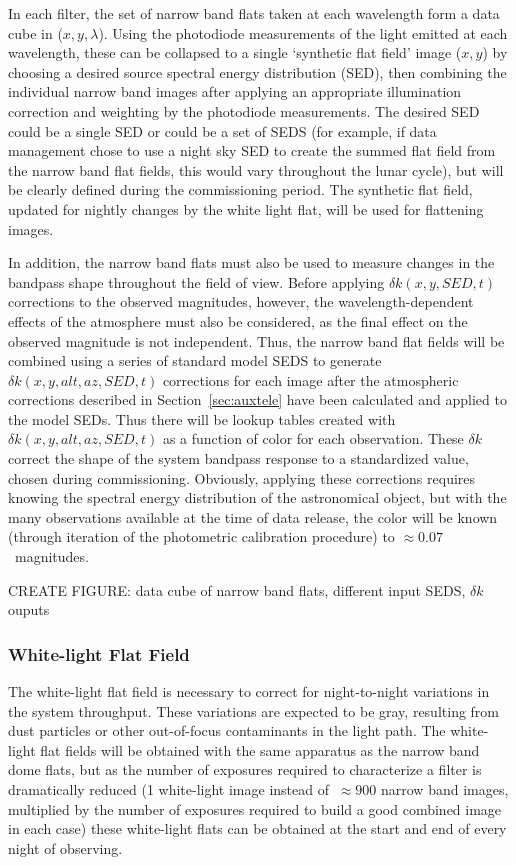 \documentclass[12pt,preprint]{aastex}
\begin{document}
In each filter, the set of narrow band flats taken at each wavelength
form a data cube in ($x,y,\lambda$). Using the photodiode measurements
of the light emitted at each wavelength, these can be collapsed to a
single `synthetic flat field' image ($x,y$) by choosing a desired source
spectral energy distribution (SED), then combining the individual narrow
band images after applying an appropriate illumination correction and
weighting by the photodiode measurements. The desired
SED could be a single SED or could be a set of SEDS (for example, if
data management chose to use a night sky SED to create the summed
flat field from the narrow band flat fields, this would vary
throughout the lunar cycle), but will be clearly defined during the
commissioning period. The synthetic flat field, updated for nightly
changes by the white light flat, will be used for flattening images.

In addition, the narrow band flats must also be used to measure
changes in the bandpass shape throughout the field of view. Before
applying $\delta k(x,y,SED,t)$ corrections to the observed magnitudes,
however, the wavelength-dependent effects of the atmosphere must also
be considered, as the final effect on the observed magnitude is not
independent. Thus, the narrow band flat fields will be combined using
a series of standard model SEDS to generate
$\delta k(x,y,alt,az,SED,t)$ corrections for each image after the atmospheric
corrections described in Section~\ref{sec:auxtele} have been
calculated and applied to the model SEDs. Thus there will be lookup
tables created with $\delta k(x,y,alt,az,SED,t)$ as a function of
color for each observation. These $\delta k$ correct the shape of the
system bandpass response to a standardized value, chosen during
commissioning.  Obviously, applying these corrections requires knowing
the spectral energy distribution of the astronomical object, but with
the many observations available at the time of data release, the color
will be known (through iteration of the photometric calibration
procedure) to $\approx 0.07$~magnitudes.

CREATE FIGURE: data cube of narrow band flats, different input SEDS,
$\delta k$ ouputs

\subsubsection{White-light Flat Field}

The white-light flat field is necessary to correct for night-to-night
variations in the system throughput. These variations are expected to
be gray, resulting from dust particles or other out-of-focus
contaminants in the light path. The white-light flat fields will be
obtained with the same apparatus as the narrow band dome flats, but as
the number of exposures required to characterize a filter is
dramatically reduced (1 white-light image instead of $~\approx900$
narrow band images, multiplied by the number of exposures required to
build a good combined image in each case) these white-light flats can
be obtained at the start and end of every night of observing.
\end{document}
